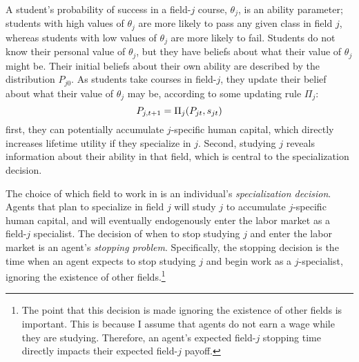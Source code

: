 A student's probability of success in a field-$j$ course, $\theta_j$, is an ability parameter; students with high values of $\theta_j$ are more likely to pass any given class in field $j$, whereas students with low values of $\theta_j$ are more likely to fail. 
Students do not know their personal value of $\theta_j$, but they have beliefs about what their value of $\theta_j$ might be. 
Their initial beliefs about their own ability are described by the distribution $P_{j0}$. 
As students take courses in field-$j$, they update their belief about what their value of $\theta_j$ may be, according to some updating rule $\Pi_j$:
\begin{equation*}
    P_{j,t+1} = \Pi_j (P_{jt}, s_{jt})
\end{equation*}
first, they can potentially accumulate $j$-specific human capital, which directly increases lifetime utility if they specialize in $j$.
Second, studying $j$ reveals information about their ability in that field, which is central to the specialization decision.


{}
The choice of which field to work in is an individual's \emph{specialization decision}.
Agents that plan to specialize in field $j$ will study $j$ to accumulate $j$-specific human capital, and will eventually endogenously enter the labor market as a field-$j$ specialist.
The decision of when to stop studying $j$ and enter the labor market is an agent's \emph{stopping problem}. 
Specifically, the stopping decision is the time when an agent expects to stop studying $j$ and begin work as a $j$-specialist, ignoring the existence of other fields.\footnote{
    The point that this decision is made ignoring the existence of other fields is important.
    This is because I assume that agents do not earn a wage while they are studying.
    Therefore, an agent's expected field-$j$ stopping time directly impacts their expected field-$j$ payoff.
}


